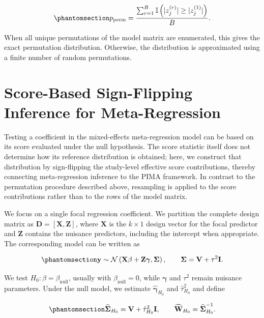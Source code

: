 \documentclass[
  man,
  longtable,
  nolmodern,
  notxfonts,
  notimes,
  colorlinks=true,linkcolor=blue,citecolor=blue,urlcolor=blue]{apa7}
\begin{document}
\begin{equation}\phantomsection\label{eq-perm-p}{
p_{\mathrm{perm}}
=
\frac{
\sum_{r=1}^{B}
\mathbb{I}\left(
|z_j^{(r)}| \geq |z_j^{(1)}|
\right)
}{
B
}.
}\end{equation}

When all unique permutations of the model matrix are enumerated, this
gives the exact permutation distribution. Otherwise, the distribution is
approximated using a finite number of random permutations.

\section{Score-Based Sign-Flipping Inference for
Meta-Regression}\label{score-based-sign-flipping-inference-for-meta-regression}

Testing a coefficient in the mixed-effects meta-regression model can be
based on its score evaluated under the null hypothesis. The score
statistic itself does not determine how its reference distribution is
obtained; here, we construct that distribution by sign-flipping the
study-level effective score contributions, thereby connecting
meta-regression inference to the PIMA framework. In contrast to the
permutation procedure described above, resampling is applied to the
score contributions rather than to the rows of the model matrix.

We focus on a single focal regression coefficient. We partition the
complete design matrix as \(\mathbf{D}=[\mathbf{X},\mathbf{Z}]\), where
\(\mathbf{X}\) is the \(k \times 1\) design vector for the focal
predictor and \(\mathbf{Z}\) contains the nuisance predictors, including
the intercept when appropriate. The corresponding model can be written
as

\begin{equation}\phantomsection\label{eq-flipmeta-model}{
\mathbf{y}
\sim
\mathcal{N}
\left(
\mathbf{X}\beta
+
\mathbf{Z}\boldsymbol{\gamma},
\boldsymbol{\Sigma}
\right),
\qquad
\boldsymbol{\Sigma}
=
\mathbf{V}
+
\tau^2\mathbf{I}.
}\end{equation}

We test \(H_0:\beta=\beta_{\mathrm{null}}\), usually with
\(\beta_{\mathrm{null}}=0\), while \(\boldsymbol{\gamma}\) and
\(\tau^2\) remain nuisance parameters. Under the null model, we estimate
\(\hat{\boldsymbol{\gamma}}_{H_0}\) and \(\hat{\tau}_{H_0}^2\) and
define

\begin{equation}\phantomsection\label{eq-null-weights}{
\widehat{\boldsymbol{\Sigma}}_{H_0}
=
\mathbf{V}
+
\hat{\tau}_{H_0}^2\mathbf{I},
\qquad
\widehat{\mathbf{W}}_{H_0}
=
\widehat{\boldsymbol{\Sigma}}_{H_0}^{-1}.
}\end{equation}
\end{document}
